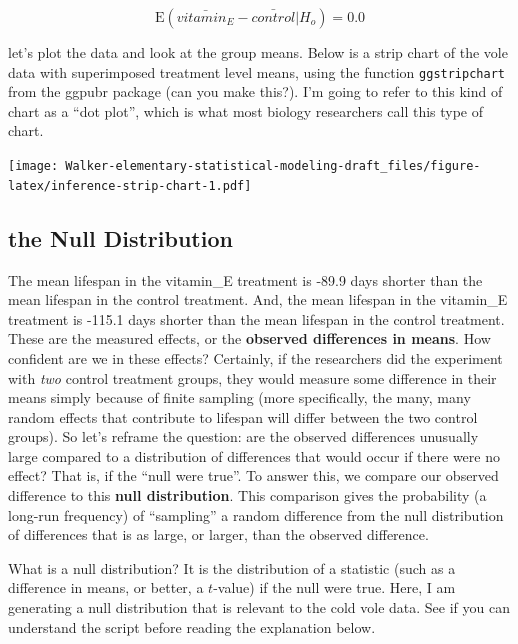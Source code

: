 \documentclass[]{book}
\begin{document}
\begin{equation}
\mathrm{E}(\bar{vitamin_E} - \bar{control} | H_o) = 0.0
\end{equation}

let's plot the data and look at the group means. Below is a strip chart
of the vole data with superimposed treatment level means, using the
function \texttt{ggstripchart} from the ggpubr package (can you make
this?). I'm going to refer to this kind of chart as a ``dot plot'',
which is what most biology researchers call this type of chart.

\texttt{[image: Walker-elementary-statistical-modeling-draft\_files/figure-latex/inference-strip-chart-1.pdf]}

\subsection{the Null Distribution}\label{the-null-distribution}

The mean lifespan in the vitamin\_E treatment is -89.9 days shorter than
the mean lifespan in the control treatment. And, the mean lifespan in
the vitamin\_E treatment is -115.1 days shorter than the mean lifespan
in the control treatment. These are the measured effects, or the
\textbf{observed differences in means}. How confident are we in these
effects? Certainly, if the researchers did the experiment with
\emph{two} control treatment groups, they would measure some difference
in their means simply because of finite sampling (more specifically, the
many, many random effects that contribute to lifespan will differ
between the two control groups). So let's reframe the question: are the
observed differences unusually large compared to a distribution of
differences that would occur if there were no effect? That is, if the
``null were true''. To answer this, we compare our observed difference
to this \textbf{null distribution}. This comparison gives the
probability (a long-run frequency) of ``sampling'' a random difference
from the null distribution of differences that is as large, or larger,
than the observed difference.

What is a null distribution? It is the distribution of a statistic (such
as a difference in means, or better, a \(t\)-value) if the null were
true. Here, I am generating a null distribution that is relevant to the
cold vole data. See if you can understand the script before reading the
explanation below.
\end{document}
